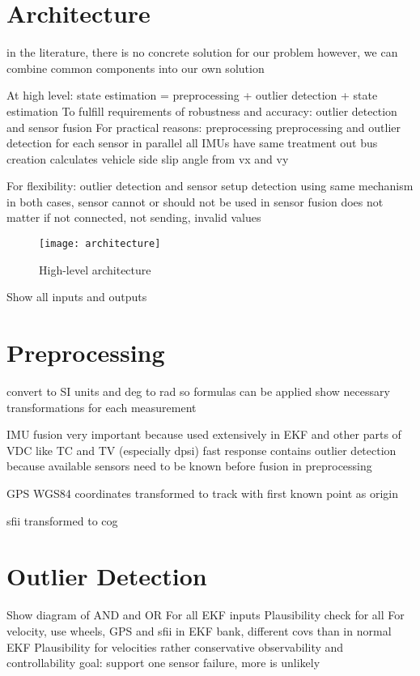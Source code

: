 \section{Architecture}
in the literature, there is no concrete solution for our problem
however, we can combine common components into our own solution

At high level: state estimation = preprocessing + outlier detection + state estimation
To fulfill requirements of robustness and accuracy: outlier detection and sensor fusion
For practical reasons: preprocessing
preprocessing and outlier detection for each sensor in parallel
all IMUs have same treatment
out bus creation calculates vehicle side slip angle from vx and vy

For flexibility: outlier detection and sensor setup detection using same mechanism
in both cases, sensor cannot or should not be used in sensor fusion
does not matter if not connected, not sending, invalid values

\begin{figure}[h]
	\centering
	\texttt{[image: architecture]}%
	\caption{High-level architecture}
	\label{fig:architecture}
\end{figure}
Show all inputs and outputs

\section{Preprocessing}
convert to SI units and deg to rad so formulas can be applied
show necessary transformations for each measurement

IMU fusion
very important because used extensively in EKF and other parts of VDC like TC and TV (especially dpsi)
fast response
contains outlier detection because available sensors need to be known before fusion in preprocessing

GPS WGS84 coordinates transformed to track with first known point as origin

sfii transformed to \gls{cog}

\section{Outlier Detection}
Show diagram of AND and OR
For all EKF inputs
Plausibility check for all
For velocity, use wheels, GPS and sfii in EKF bank, different covs than in normal EKF
Plausibility for velocities rather conservative
observability and controllability
goal: support one sensor failure, more is unlikely

